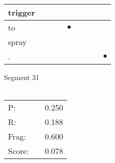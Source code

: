 \documentclass[landscape]{article}
\newcommand{\ssp}{\hspace{2pt}}
\newcommand{\mex}{\cellcolor{g}$\bullet$}
\begin{document}
\begin{tabular}{|l|p{10pt}|p{10pt}|p{10pt}|p{10pt}|p{10pt}|p{10pt}|p{10pt}|p{10pt}|}
\hline
\ssp trigger \ssp&\hspace{2pt}&\hspace{2pt}&\hspace{2pt}&\hspace{2pt}&\hspace{2pt}&\hspace{2pt}&\hspace{2pt}&\hspace{2pt}\\
\hline
\ssp \cellcolor{ref3}to \ssp&\hspace{2pt}&\hspace{2pt}&\hspace{2pt}&\hspace{2pt}\mex&\hspace{2pt}&\hspace{2pt}&\hspace{2pt}&\hspace{2pt}\\
\hline
\ssp spray \ssp&\hspace{2pt}&\hspace{2pt}&\hspace{2pt}&\hspace{2pt}&\hspace{2pt}&\hspace{2pt}&\hspace{2pt}&\hspace{2pt}\\
\hline
\ssp \cellcolor{ref7}. \ssp&\hspace{2pt}&\hspace{2pt}&\hspace{2pt}&\hspace{2pt}&\hspace{2pt}&\hspace{2pt}&\hspace{2pt}&\hspace{2pt}\mex\\
\hline
\end{tabular}

\vspace{6pt}
\noindent Segment 31\\\\
\noindent\begin{tabular}{lm{12pt}r}
\hline
P:&&0.250\\
R:&&0.188\\
Frag:&&0.600\\
Score:&&0.078\\
\end{tabular}
\end{document}
